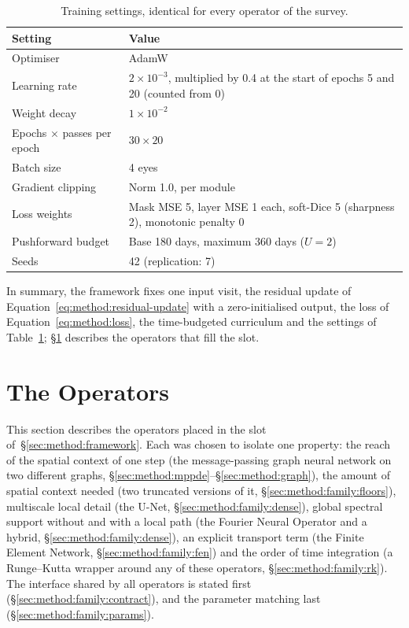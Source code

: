 \begin{table}[t]
  \centering
  \caption[Shared training settings.]{%
    Training settings, identical for every operator of the survey.}
  \label{tab:method:hparams}
  \small
  \begin{tabular}{p{} p{}}
    \toprule
    Setting & Value \\
    \midrule
    Optimiser & AdamW \\
    Learning rate & $2 \times 10^{-3}$, multiplied by 0.4 at the start of
      epochs 5 and 20 (counted from 0) \\
    Weight decay & $1 \times 10^{-2}$ \\
    Epochs $\times$ passes per epoch & $30 \times 20$ \\
    Batch size & 4 eyes \\
    Gradient clipping & Norm 1.0, per module \\
    Loss weights & Mask MSE 5, layer MSE 1 each, soft-Dice 5 (sharpness
      2), monotonic penalty 0 \\
    Pushforward budget & Base 180 days, maximum 360 days ($U = 2$) \\
    Seeds & 42 (replication: 7) \\
    \bottomrule
  \end{tabular}
\end{table}

In summary, the framework fixes one input visit, the residual update of
Equation~\eqref{eq:method:residual-update} with a zero-initialised output,
the loss of Equation~\eqref{eq:method:loss}, the time-budgeted curriculum
and the settings of Table~\ref{tab:method:hparams};
\S\ref{sec:method:family} describes the operators that fill the slot.

\section{The Operators}
\label{sec:method:family}

This section describes the operators placed in the slot
of~\S\ref{sec:method:framework}. Each was chosen to isolate one property:
the reach of the spatial context of one step (the message-passing graph
neural network on two different graphs,
\S\ref{sec:method:mppde}--\S\ref{sec:method:graph}), the amount of spatial
context needed (two truncated versions of it,
\S\ref{sec:method:family:floors}), multiscale local detail (the U-Net,
\S\ref{sec:method:family:dense}), global spectral support without and with
a local path (the Fourier Neural Operator and a hybrid,
\S\ref{sec:method:family:dense}), an explicit transport term (the Finite
Element Network, \S\ref{sec:method:family:fen}) and the order of time
integration (a Runge--Kutta wrapper around any of these operators,
\S\ref{sec:method:family:rk}). The interface shared by all operators is
stated first (\S\ref{sec:method:family:contract}), and the parameter
matching last (\S\ref{sec:method:family:params}).

